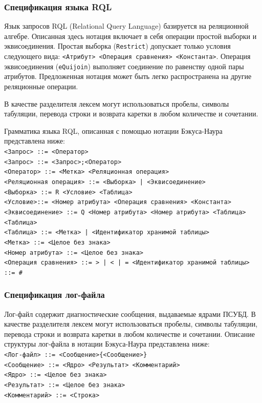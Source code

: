 \documentclass[11pt,oneside]{article}
\begin{document}
	\subsubsection{Спецификация языка RQL}\label{S_RQL}
	\par Язык запросов RQL (Relational Query Language) базируется на реляционной алгебре. Описанная здесь нотация включает в себя операции простой выборки и эквисоединения. Простая выборка (\texttt{Restrict}) допускает только условия следующего вида: \texttt{<Атрибут> <Операция сравнения> <Константа>}. Операция эквисоединения (\texttt{eQuijoin}) выполняет соединение по равенству одной пары атрибутов. Предложенная нотация может быть легко распространена на другие реляционные операции.
	\par В качестве разделителя лексем могут использоваться пробелы, символы табуляции, перевода строки и возврата каретки в любом количестве и сочетании.
	\par Грамматика языка RQL, описанная с помощью нотации Бэкуса-Наура представлена ниже:\\
	\texttt{<Запрос> ::= <Оператор>\\
		<Запрос> ::= <Запрос>;<Оператор>\\
		<Оператор> ::= <Метка> <Реляционная операция>\\
		<Реляционная операция> ::= <Выборка> | <Эквисоединение>\\
		<Выборка> ::= R <Условие> <Таблица>\\
		<Условие>::= <Номер атрибута> <Операция сравнения> <Константа>\\
		<Эквисоединение> ::= Q <Номер атрибута> <Номер атрибута> <Таблица> <Таблица>\\
		<Таблица> ::= <Метка> | <Идентификатор хранимой таблицы>\\
		<Метка> ::= <Целое без знака>\\
		<Номер атрибута> ::= <Целое без знака>\\
		<Операция сравнения> ::= > | < | = <Идентификатор хранимой таблицы> ::= \#<Целое без знака>
	}
	
	\subsubsection{Спецификация лог-файла}\label{S_LOG}
	Лог-файл содержит диагностические сообщения, выдаваемые ядрами ПСУБД.
	В качестве разделителя лексем могут использоваться пробелы, символы табуляции, перевода строки и возврата каретки в любом количестве и сочетании. Описание структуры лог-файла в нотации Бэкуса-Наура представлена ниже:\\
	\texttt{<Лог-файл> ::= <Сообщение>\{<Сообщение>\}\\
		<Сообщение> ::= <Ядро> <Результат> <Комментарий>\\
		<Ядро> ::= <Целое без знака>\\
		<Результат> ::= <Целое без знака>\\
		<Комментарий> ::= <Строка>
	}
	
\end{document}
